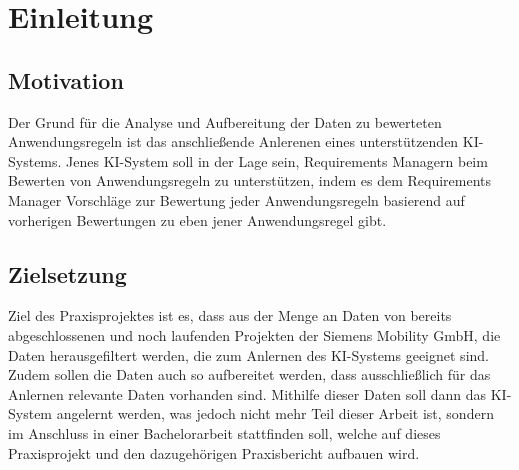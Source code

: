 \chapter{Einleitung}
\label{chap:einleitung}


\section*{Motivation}
Der Grund für die Analyse und Aufbereitung der Daten zu bewerteten Anwendungsregeln ist das anschließende Anlerenen eines unterstützenden KI-Systems. Jenes KI-System soll in der Lage sein,
Requirements Managern beim Bewerten von Anwendungsregeln zu unterstützen, indem es dem Requirements Manager Vorschläge zur Bewertung jeder Anwendungsregeln basierend auf vorherigen Bewertungen zu
eben jener Anwendungsregel gibt.

\section*{Zielsetzung}
Ziel des Praxisprojektes ist es, dass aus der Menge an Daten von bereits abgeschlossenen und noch laufenden Projekten der Siemens Mobility GmbH, die Daten herausgefiltert werden, die 
zum Anlernen des KI-Systems geeignet sind. Zudem sollen die Daten auch so aufbereitet werden, dass ausschließlich für das Anlernen relevante Daten vorhanden sind. Mithilfe dieser Daten
soll dann das KI-System angelernt werden, was jedoch nicht mehr Teil dieser Arbeit ist, sondern im Anschluss in einer Bachelorarbeit stattfinden soll, welche auf dieses Praxisprojekt und den 
dazugehörigen Praxisbericht aufbauen wird.

